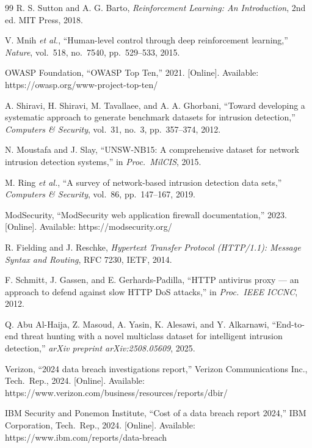 \documentclass[12pt,a4paper]{report}
\begin{document}
\begin{thebibliography}{99}
R. S. Sutton and A. G. Barto, \textit{Reinforcement Learning: An Introduction}, 2nd ed. MIT Press, 2018.

V. Mnih \textit{et al.}, ``Human-level control through deep reinforcement learning,'' \textit{Nature}, vol.\ 518, no.\ 7540, pp.\ 529--533, 2015.

OWASP Foundation, ``OWASP Top Ten,'' 2021. [Online]. Available: https://owasp.org/www-project-top-ten/

A. Shiravi, H. Shiravi, M. Tavallaee, and A. A. Ghorbani, ``Toward developing a systematic approach to generate benchmark datasets for intrusion detection,'' \textit{Computers \& Security}, vol.\ 31, no.\ 3, pp.\ 357--374, 2012.

N. Moustafa and J. Slay, ``UNSW-NB15: A comprehensive dataset for network intrusion detection systems,'' in \textit{Proc.\ MilCIS}, 2015.

M. Ring \textit{et al.}, ``A survey of network-based intrusion detection data sets,'' \textit{Computers \& Security}, vol.\ 86, pp.\ 147--167, 2019.

ModSecurity, ``ModSecurity web application firewall documentation,'' 2023. [Online]. Available: https://modsecurity.org/

R. Fielding and J. Reschke, \textit{Hypertext Transfer Protocol (HTTP/1.1): Message Syntax and Routing}, RFC 7230, IETF, 2014.

F. Schmitt, J. Gassen, and E. Gerhards-Padilla, ``HTTP antivirus proxy --- an approach to defend against slow HTTP DoS attacks,'' in \textit{Proc.\ IEEE ICCNC}, 2012.

Q. Abu Al-Haija, Z. Masoud, A. Yasin, K. Alesawi, and Y. Alkarnawi, ``End-to-end threat hunting with a novel multiclass dataset for intelligent intrusion detection,'' \textit{arXiv preprint arXiv:2508.05609}, 2025.

Verizon, ``2024 data breach investigations report,'' Verizon Communications Inc., Tech.\ Rep., 2024. [Online]. Available: https://www.verizon.com/business/resources/reports/dbir/

IBM Security and Ponemon Institute, ``Cost of a data breach report 2024,'' IBM Corporation, Tech.\ Rep., 2024. [Online]. Available: https://www.ibm.com/reports/data-breach


\end{thebibliography}
\end{document}
